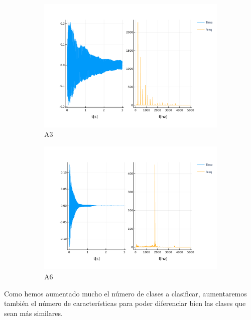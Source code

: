 \documentclass[12pt]{article}
\begin{document}
\begin{figure}[!ht]
	\centering
	\begin{subfigure}{.5\textwidth}
		\centering
		\includegraphics[width=1.0\linewidth]{assets/A3.pdf}
		\caption{A3}
		\label{fig:a3}
	\end{subfigure}%
	\begin{subfigure}{.5\textwidth}
		\centering
		\includegraphics[width=1.0\linewidth]{assets/A6.pdf}
		\caption{A6}
		\label{fig:a6}
	\end{subfigure}
	\caption{}
\end{figure}


Como hemos aumentado mucho el número de clases a clasificar, aumentaremos también el número de características 
para poder diferenciar bien las clases que sean más similares.
\end{document}

